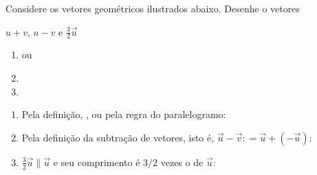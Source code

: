 \def\mypath{mathematics/2}

\newcommand\inlinebox[2][-0.5]{\raisebox{#1\height}{#2}}

\begin{question}
	\newcommand\mycoloneqq{\ensuremath{\mathrel{\mathop:}=}} %

	Considere os vetores geométricos ilustrados abaixo.
	Desenhe o vetores
	\begin{inlineenum}
		\inlineitem $u + v$,
		\inlineitem $u - v$ e
		\inlineitem $\frac{3}{2}\vec u$
	\end{inlineenum}

	\begin{center}
		
	\end{center}

	\begin{answer}
		\begin{enumerate}
			\item \inlinebox{} ou \inlinebox{}

			\item \inlinebox{}

			\item \inlinebox{}
		\end{enumerate}
	\end{answer}

	\begin{solution}
		\begin{enumerate}
			\item
			Pela definição, \inlinebox{}, ou pela regra do paralelogramo: \inlinebox{}

			\item
			Pela definição da subtração de vetores, isto é, $\vec u - \vec v \mycoloneqq \vec u + (-\vec u)$:
			\inlinebox{}

			\item
			$\frac{3}{2}\vec u \parallel \vec u$ e seu comprimento é $3/2$ vezes o de $\vec u$:
			\inlinebox{}
		\end{enumerate}
	\end{solution}
\end{question}

	
